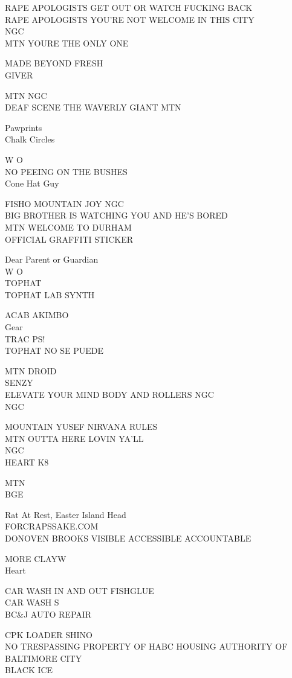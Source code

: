 \documentclass[10pt,letterpaper]{article}
\begin{document}
RAPE APOLOGISTS GET OUT OR WATCH FUCKING BACK\\
RAPE APOLOGISTS YOU'RE NOT WELCOME IN THIS CITY\\
NGC\\
MTN YOURE THE ONLY ONE

MADE BEYOND FRESH\\
GIVER

MTN NGC\\
DEAF SCENE THE WAVERLY GIANT MTN

Pawprints\\
Chalk Circles

W O\\
NO PEEING ON THE BUSHES\\
Cone Hat Guy

FISHO MOUNTAIN JOY NGC\\
BIG BROTHER IS WATCHING YOU AND HE'S BORED\\
MTN WELCOME TO DURHAM\\
OFFICIAL GRAFFITI STICKER

Dear Parent or Guardian\\
W O\\
TOPHAT\\
TOPHAT LAB SYNTH

ACAB AKIMBO\\
Gear\\
TRAC PS!\\
TOPHAT NO SE PUEDE

MTN DROID\\
SENZY\\
ELEVATE YOUR MIND BODY AND ROLLERS NGC\\
NGC

MOUNTAIN YUSEF NIRVANA RULES\\
MTN OUTTA HERE LOVIN YA'LL\\
NGC\\
HEART K8

MTN\\
BGE

Rat At Rest, Easter Island Head\\
FORCRAPSSAKE.COM\\
DONOVEN BROOKS VISIBLE ACCESSIBLE ACCOUNTABLE

MORE CLAYW\\
Heart

CAR WASH IN AND OUT FISHGLUE\\
CAR WASH S\\
BC\&J AUTO REPAIR

CPK LOADER SHINO\\
NO TRESPASSING PROPERTY OF HABC HOUSING AUTHORITY OF BALTIMORE CITY\\
BLACK ICE
\end{document}
